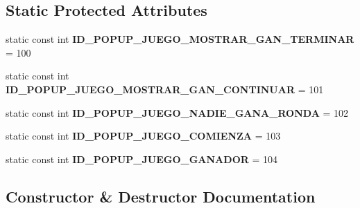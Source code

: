 \subsection*{Static Protected Attributes}
\begin{DoxyCompactItemize}
\item 
static const int {\bfseries I\+D\+\_\+\+P\+O\+P\+U\+P\+\_\+\+J\+U\+E\+G\+O\+\_\+\+M\+O\+S\+T\+R\+A\+R\+\_\+\+G\+A\+N\+\_\+\+T\+E\+R\+M\+I\+N\+AR} = 100\hypertarget{class_juego_a5f4d5d2c7acd60f179810e6bfb191cf8}{}\label{class_juego_a5f4d5d2c7acd60f179810e6bfb191cf8}

\item 
static const int {\bfseries I\+D\+\_\+\+P\+O\+P\+U\+P\+\_\+\+J\+U\+E\+G\+O\+\_\+\+M\+O\+S\+T\+R\+A\+R\+\_\+\+G\+A\+N\+\_\+\+C\+O\+N\+T\+I\+N\+U\+AR} = 101\hypertarget{class_juego_a172da2cda4fea948201744d46d281a6c}{}\label{class_juego_a172da2cda4fea948201744d46d281a6c}

\item 
static const int {\bfseries I\+D\+\_\+\+P\+O\+P\+U\+P\+\_\+\+J\+U\+E\+G\+O\+\_\+\+N\+A\+D\+I\+E\+\_\+\+G\+A\+N\+A\+\_\+\+R\+O\+N\+DA} = 102\hypertarget{class_juego_a70048dac849babf67e634558ab45ad83}{}\label{class_juego_a70048dac849babf67e634558ab45ad83}

\item 
static const int {\bfseries I\+D\+\_\+\+P\+O\+P\+U\+P\+\_\+\+J\+U\+E\+G\+O\+\_\+\+C\+O\+M\+I\+E\+N\+ZA} = 103\hypertarget{class_juego_a3c5d91df9c859b59da6087b196d1e8a2}{}\label{class_juego_a3c5d91df9c859b59da6087b196d1e8a2}

\item 
static const int {\bfseries I\+D\+\_\+\+P\+O\+P\+U\+P\+\_\+\+J\+U\+E\+G\+O\+\_\+\+G\+A\+N\+A\+D\+OR} = 104\hypertarget{class_juego_ace2ce255fa30d22737d00caa91962b47}{}\label{class_juego_ace2ce255fa30d22737d00caa91962b47}

\end{DoxyCompactItemize}


\subsection{Constructor \& Destructor Documentation}
